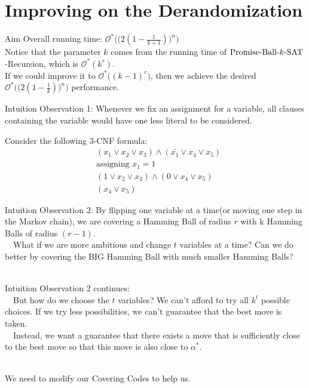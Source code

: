 \documentclass[pdf] {beamer}
\newcommand{\SAT}{\textnormal{$k$-SAT}}
\newcommand{\astar}{\alpha^*}
\newcommand{\PBS}{\textnormal{Promise-Ball-$\SAT$}}
\renewcommand{\O}{\mathcal{O}^*}
\begin{document}
\section{Improving on the Derandomization}
	\begin{frame}{Aim}
	Overall running time: $\O\Big(\big(2(1-\frac{1}{k+1})\big)^n\Big)$\\
	Notice that the parameter $k$ comes from the running time of $\PBS$-Recursion, which is $\O(k^r)$.\\
	If we could improve it to $\O\big((k-1)^r\big)$, then we achieve the desired $\O\Big(\big(2(1-\frac{1}{k})\big)^n\Big)$ performance.
	\end{frame}
	\begin{frame}{Intuition}
	Observation 1: Whenever we fix an assignment for a variable, all clauses containing the variable would have one less literal to be considered. 
	\begin{example}
		Consider the following $3$-CNF formula:
	\begin{align*}
	&(x_1 \lor x_2 \lor x_3) \land (\bar{x_1} \lor x_4 \lor x_5)\\
	&\text{assigning }x_1 = 1\\
	&(1 \lor x_2 \lor x_3) \land (0 \lor x_4 \lor x_5)\\
	&(x_4 \lor x_5)
	\end{align*}
	\end{example}

	\end{frame}	
	\begin{frame}{Intuition}
	Observation 2: By flipping one variable at a time(or moving one step in the Markov chain), we are covering a Hamming Ball of radius $r$ with k Hamming Balls of radius $(r-1)$. \\~\
	What if we are more ambitious and change $t$ variables at a time? Can we do better by covering the BIG Hamming Ball with much smaller Hamming Balls? \\~\
	\end{frame}	
	\begin{frame}{Intuition}
		Observation 2 continues:\\~\
		But how do we choose the $t$ variables? We can't afford to try all $k^t$ possible choices. If we try less possibilities, we can't guarantee that the best move is taken.\\~\ Instead, we want a guarantee that there exists a move that is sufficiently close to the best move so that this move is also close to $\astar$.\\~\ 
		
	We need to modify our Covering Codes to help us.
\end{frame}
\end{document}

